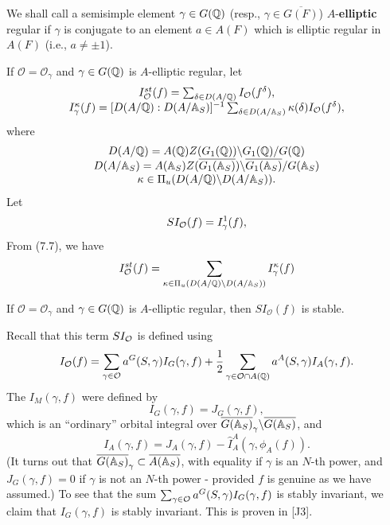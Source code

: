We shall call a semisimple element
$\gamma \in G(\mathbb{Q} )$
(resp., $\gamma \in \overline{G(F)}$) $A$-\textbf{elliptic} regular if
$\gamma $ is conjugate to an element $a\in A(F)$
which is elliptic regular in $A(F)$ (i.e., $a\not= \pm 1$).

If $\mathcal{O}=\mathcal{O}_\gamma $ and
$\gamma \in G(\mathbb{Q} )$ is $A$-elliptic regular, let 
\begin{equation}
\begin{array}{c}
I^{st}_{\cal{O}}(f)=
\sum_{\delta\in D(A/\mathbb{Q} )}
I_{\cal{O}} (f^\delta),\\
I^\kappa_\gamma(f)
=[D(A/\mathbb{Q} ):D(A/\mathbb{A} _S)]^{-1}
\sum_{\delta\in D(A/\mathbb{A} _S)}
\kappa(\delta) I_{\cal{O}} (f^\delta),
\end{array}
\end{equation}
where
\[
\begin{array}{c}
D(A/\mathbb{Q} )
=A(\mathbb{Q} )Z(G_1(\mathbb{Q} ))\backslash G_1(\mathbb{Q} )/G(\mathbb{Q} ) \\
D(A/\mathbb{A} _S)
=A(\mathbb{A} _S)Z(\overline{G_1(\mathbb{A} _S)})
\backslash \overline{G_1(\mathbb{A} _S)}/G(\mathbb{A} _S) \\
\kappa\in \Pi_u(D(A/\mathbb{Q} )\backslash D(A/\mathbb{A} _S)).
\end{array}
\]
Let
\[
SI_{\cal{O}}(f)=I^1_{\gamma} (f),
\]
From (7.7), we have
\begin{equation}
I^{st}_{\cal{O}}(f)=
\sum_{\kappa\in \Pi_u(D(A/\mathbb{Q} )\backslash D(A/\mathbb{A} _S))}
I^\kappa_\gamma(f)
\end{equation}
\begin{lemma}
If $\mathcal{O}=\mathcal{O}_\gamma $ and
$\gamma \in G(\mathbb{Q} )$ is $A$-elliptic regular, then
$SI_{\mathcal{O}}(f)$ is stable.
\end{lemma}

Recall that this term $SI_{\cal{O}}$ is defined using
\begin{equation}
I_{\cal{O}}(f)
=\sum_{\gamma\in {\cal{O}}}a^G(S,\gamma)I_G(\gamma,f)
+{1\over 2}\sum_{\gamma\in {\cal{O}}\cap A(\mathbb{Q} )}
a^A(S,\gamma)I_A(\gamma,f).
\end{equation}
The $I_M(\gamma,f)$ were defined by
\[
I_G(\gamma,f)=J_G(\gamma,f),
\]
which is an ``ordinary'' orbital integral over
$\overline{G(\mathbb{A} _S)}_\gamma\backslash \overline{G(\mathbb{A} _S)}$, and
\[
I_A(\gamma,f)=J_A(\gamma,f)-\hat{I}_A^A(\gamma,\phi_A(f)).
\]
(It turns out that
$\overline{G(\mathbb{A} _S)}_\gamma\subset \overline{A(\mathbb{A} _S)}$,
with equality if $\gamma$ is an $N$-th power, and
$J_G(\gamma,f)=0$ if $\gamma$ is not an $N$-th power - provided
$f$ is genuine as we have assumed.)
To see that the sum
$\sum_{\gamma\in {\cal{O}}}a^G(S,\gamma)I_G(\gamma,f)$
is stably invariant, we claim that $I_G(\gamma,f)$ is stably invariant.
This is proven in [J3].

